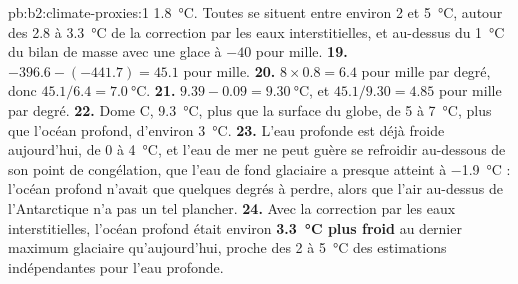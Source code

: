 \begin{solution}{pb:b2:climate-proxies:1}
\qty{1.8}{\celsius}. Toutes se situent entre environ 2 et \qty{5}{\celsius}, autour des 2.8 à
\qty{3.3}{\celsius} de la correction par les eaux interstitielles, et au-dessus du \qty{1}{\celsius} du bilan de
masse avec une glace à $-40$ pour mille.
\textbf{19.} $-396.6 - (-441.7) = 45.1$ pour mille.
\textbf{20.} $8 \times 0.8 = 6.4$ pour mille par degré, donc $45.1/6.4 = \qty{7.0}{\celsius}$.
\textbf{21.} $9.39 - 0.09 = \qty{9.30}{\celsius}$, et $45.1/9.30 = 4.85$ pour mille par degré.
\textbf{22.} Dome C, \qty{9.3}{\celsius}, plus que la surface du globe, de 5 à \qty{7}{\celsius}, plus
que l'océan profond, d'environ \qty{3}{\celsius}.
\textbf{23.} L'eau profonde est déjà froide aujourd'hui, de 0 à \qty{4}{\celsius}, et l'eau de mer ne peut guère se refroidir
au-dessous de son point de congélation, que l'eau de fond glaciaire a presque atteint à
\qty{-1.9}{\celsius} : l'océan profond n'avait que quelques degrés à perdre, alors que l'air au-dessus de l'Antarctique
n'a pas un tel plancher.
\textbf{24.} Avec la correction par les eaux interstitielles, l'océan profond était environ \textbf{\qty{3.3}{\celsius}
plus froid} au dernier maximum glaciaire qu'aujourd'hui, proche des 2 à \qty{5}{\celsius} des estimations
indépendantes pour l'eau profonde.
\end{solution}
